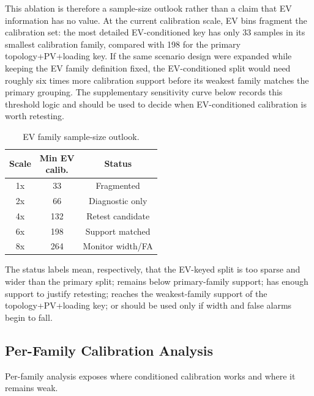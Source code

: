 \documentclass[
  preprint,12pt]{elsarticle}
\begin{document}
This ablation is therefore a sample-size outlook rather than a claim
that EV information has no value. At the current calibration scale, EV
bins fragment the calibration set: the most detailed EV-conditioned key
has only 33 samples in its smallest calibration family, compared with
198 for the primary topology+PV+loading key. If the same scenario design
were expanded while keeping the EV family definition fixed, the
EV-conditioned split would need roughly six times more calibration
support before its weakest family matches the primary grouping. The
supplementary sensitivity curve below records this threshold logic and
should be used to decide when EV-conditioned calibration is worth
retesting.

\begin{longtable}[]{@{}ccc@{}}
\caption{EV family sample-size outlook.}\\\toprule\noalign{}
Scale & \shortstack{Min EV\\calib.} & Status \\
\midrule\noalign{}
\endhead
\bottomrule\noalign{}
\endlastfoot
1x & 33 & Fragmented \\
2x & 66 & Diagnostic only \\
4x & 132 & Retest candidate \\
6x & 198 & Support matched \\
8x & 264 & Monitor width/FA \\
\end{longtable}

The status labels mean, respectively, that the EV-keyed split is too
sparse and wider than the primary split; remains below primary-family
support; has enough support to justify retesting; reaches the
weakest-family support of the topology+PV+loading key; or should be used
only if width and false alarms begin to fall.

\subsection{Per-Family Calibration
Analysis}\label{per-family-calibration-analysis}

Per-family analysis exposes where conditioned calibration works and
where it remains weak.
\end{document}
